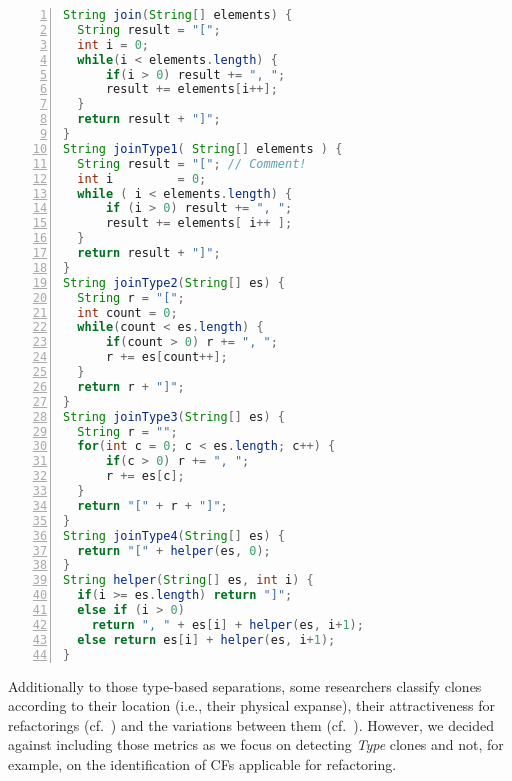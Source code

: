 \documentclass[10pt,journal,compsoc]{IEEEtran}
\def\T#1{\textsl{Type\nobreakdash-#1}}
\def\todo#1{\textcolor{brown!80!yellow!70!black!90!red}{[\textsc{todo}: \textsf{#1}]}}
\begin{document}
\begin{lstlisting}[float,caption={Example of the four different clone types \protect\T{1\,--\,4} in Java (based on {\cite[Listing 1]{saini2018oreo}} and {\cite[List 3]{wu2020scdetector}}).\bigskip},abovecaptionskip=0pt,language=Java,basicstyle=\ttfamily,numbers=left,frame=single,keywordstyle={[2]{\itshape}},morekeywords={[2]{String}},numberstyle=\sffamily\scriptsize,label=clone-types-examples]
String join(String[] elements) {
  String result = "[";
  int i = 0;
  while(i < elements.length) {
      if(i > 0) result += ", ";
      result += elements[i++];
  }
  return result + "]";
}
String joinType1( String[] elements ) {
  String result = "["; // Comment!
  int i         = 0;
  while ( i < elements.length) {
      if (i > 0) result += ", ";
      result += elements[ i++ ];
  }
  return result + "]";
}
String joinType2(String[] es) {
  String r = "[";
  int count = 0;
  while(count < es.length) {
      if(count > 0) r += ", ";
      r += es[count++];
  }
  return r + "]";
}
String joinType3(String[] es) {
  String r = "";
  for(int c = 0; c < es.length; c++) {
      if(c > 0) r += ", ";
      r += es[c];
  }
  return "[" + r + "]";
}
String joinType4(String[] es) {
  return "[" + helper(es, 0);
}
String helper(String[] es, int i) {
  if(i >= es.length) return "]";
  else if (i > 0)
    return ", " + es[i] + helper(es, i+1);
  else return es[i] + helper(es, i+1);
}
\end{lstlisting}

Additionally to those type-based separations, some researchers classify clones according to their location (i.e., their physical expanse), their attractiveness for refactorings (cf.~\cite{gautam2016various}) and the variations between them (cf.~\cite{gorg2017deriving}).
However, we decided against including those metrics as we focus on detecting \T4 clones and not, for example, on the identification of CFs applicable for refactoring.


\end{document}
